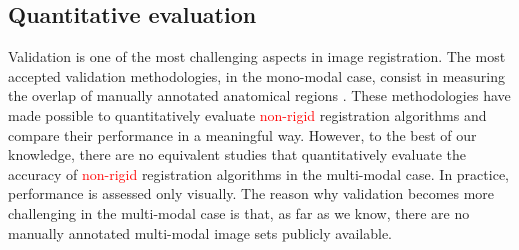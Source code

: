 \subsection{Quantitative evaluation}
Validation is one of the most challenging aspects in image registration. The most accepted validation methodologies, in the mono-modal case, consist in measuring the overlap of manually annotated anatomical regions \cite{Klein2009, Klein2010, Rohlfing2012}. These methodologies have made possible to quantitatively evaluate \textcolor{red}{non-rigid} registration algorithms and compare their performance in a meaningful way. However, to the best of our knowledge, there are no equivalent studies that quantitatively evaluate the accuracy of \textcolor{red}{non-rigid} registration algorithms in the multi-modal case. In practice, performance is assessed only visually. The reason why validation becomes more challenging in the multi-modal case is that, as far as we know, there are no manually annotated multi-modal image sets publicly available.

\vspace{-0.2cm}

